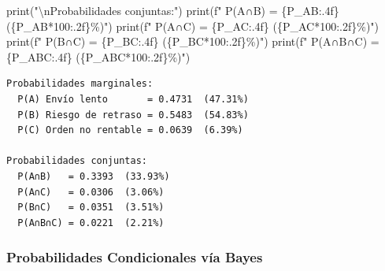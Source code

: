 \documentclass[
  letterpaper,
  DIV=11,
  numbers=noendperiod]{scrartcl}
\newenvironment{Shaded}{\begin{snugshade}}{\end{snugshade}}
\newcommand{\BuiltInTok}[1]{\textcolor[rgb]{0.00,0.23,0.31}{#1}}
\newcommand{\CharTok}[1]{\textcolor[rgb]{0.13,0.47,0.30}{#1}}
\newcommand{\DecValTok}[1]{\textcolor[rgb]{0.68,0.00,0.00}{#1}}
\newcommand{\NormalTok}[1]{\textcolor[rgb]{0.00,0.23,0.31}{#1}}
\newcommand{\OperatorTok}[1]{\textcolor[rgb]{0.37,0.37,0.37}{#1}}
\newcommand{\SpecialCharTok}[1]{\textcolor[rgb]{0.37,0.37,0.37}{#1}}
\newcommand{\SpecialStringTok}[1]{\textcolor[rgb]{0.13,0.47,0.30}{#1}}
\newcommand{\StringTok}[1]{\textcolor[rgb]{0.13,0.47,0.30}{#1}}
\begin{document}
\begin{Shaded}
\begin{Highlighting}[]
\BuiltInTok{print}\NormalTok{(}\StringTok{"}\CharTok{\textbackslash{}n}\StringTok{Probabilidades conjuntas:"}\NormalTok{)}
\BuiltInTok{print}\NormalTok{(}\SpecialStringTok{f"  P(A∩B)   = }\SpecialCharTok{\{}\NormalTok{P\_AB}\SpecialCharTok{:.4f\}}\SpecialStringTok{  (}\SpecialCharTok{\{}\NormalTok{P\_AB}\OperatorTok{*}\DecValTok{100}\SpecialCharTok{:.2f\}}\SpecialStringTok{\%)"}\NormalTok{)}
\BuiltInTok{print}\NormalTok{(}\SpecialStringTok{f"  P(A∩C)   = }\SpecialCharTok{\{}\NormalTok{P\_AC}\SpecialCharTok{:.4f\}}\SpecialStringTok{  (}\SpecialCharTok{\{}\NormalTok{P\_AC}\OperatorTok{*}\DecValTok{100}\SpecialCharTok{:.2f\}}\SpecialStringTok{\%)"}\NormalTok{)}
\BuiltInTok{print}\NormalTok{(}\SpecialStringTok{f"  P(B∩C)   = }\SpecialCharTok{\{}\NormalTok{P\_BC}\SpecialCharTok{:.4f\}}\SpecialStringTok{  (}\SpecialCharTok{\{}\NormalTok{P\_BC}\OperatorTok{*}\DecValTok{100}\SpecialCharTok{:.2f\}}\SpecialStringTok{\%)"}\NormalTok{)}
\BuiltInTok{print}\NormalTok{(}\SpecialStringTok{f"  P(A∩B∩C) = }\SpecialCharTok{\{}\NormalTok{P\_ABC}\SpecialCharTok{:.4f\}}\SpecialStringTok{  (}\SpecialCharTok{\{}\NormalTok{P\_ABC}\OperatorTok{*}\DecValTok{100}\SpecialCharTok{:.2f\}}\SpecialStringTok{\%)"}\NormalTok{)}
\end{Highlighting}
\end{Shaded}

\begin{verbatim}
Probabilidades marginales:
  P(A) Envío lento       = 0.4731  (47.31%)
  P(B) Riesgo de retraso = 0.5483  (54.83%)
  P(C) Orden no rentable = 0.0639  (6.39%)

Probabilidades conjuntas:
  P(A∩B)   = 0.3393  (33.93%)
  P(A∩C)   = 0.0306  (3.06%)
  P(B∩C)   = 0.0351  (3.51%)
  P(A∩B∩C) = 0.0221  (2.21%)
\end{verbatim}

\subsubsection{Probabilidades Condicionales vía
Bayes}\label{probabilidades-condicionales-vuxeda-bayes}
\end{document}
